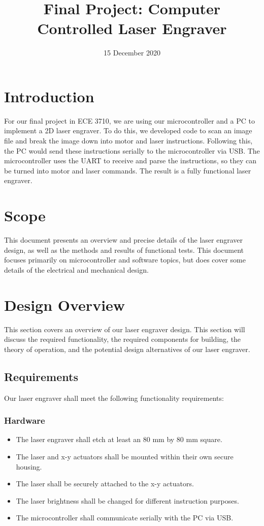 \documentclass[11pt]{LaTeX-Classes/math-hw}
\title{Final Project: Computer Controlled Laser Engraver}
\date{15 December 2020}
\begin{document}
\maketitle

\section{Introduction}
For our final project in ECE 3710, we are using our microcontroller and a PC to implement a 2D laser engraver. To do this, we developed code to scan an image file and break the image down into motor and laser instructions. Following this, the PC would send these instructions serially to the microcontroller via USB. The microcontroller uses the UART to receive and parse the instructions, so they can be turned into motor and laser commands. The result is a fully functional laser engraver.

\section{Scope}
This document presents an overview and precise details of the laser engraver design,
as well as the methods and results of functional tests.
This document focuses primarily on microcontroller and software topics,
but does cover some details of the electrical and mechanical design.

\section{Design Overview}
This section covers an overview of our laser engraver design. This section will discuss the required functionality, the required components for building, the theory of operation, and the potential design alternatives of our laser engraver.
\subsection{Requirements}
Our laser engraver shall meet the following functionality requirements:
\subsubsection*{Hardware}
	\begin{itemize}
		\item The laser engraver shall etch at least an 80 mm by 80 mm square.
		\item The laser and x-y actuators shall be mounted within their own secure housing.
		\item The laser shall be securely attached to the x-y actuators.
		\item The laser brightness shall be changed for different instruction purposes.
		\item The microcontroller shall communicate serially with the PC via USB.
	\end{itemize}
\end{document}
